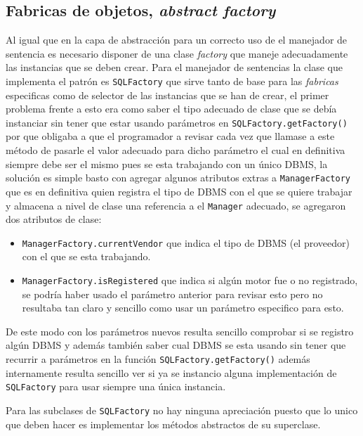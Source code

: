 \subsection{Fabricas de objetos, \textit{abstract factory}}
%
Al igual que en la capa de abstracción para un correcto uso de el manejador de sentencia es necesario disponer de una clase \textit{factory} que maneje adecuadamente las instancias que se deben crear. Para el manejador de sentencias la clase que implementa el patrón es \verb=SQLFactory= que sirve tanto de base para las \textit{fabricas} especificas como de selector de las instancias que se han de crear, el primer problema frente a esto era como saber el tipo adecuado de clase que se debía instanciar sin tener que estar usando parámetros en \verb=SQLFactory.getFactory()= por que obligaba a que el programador a revisar cada vez que llamase a este método de pasarle el valor adecuado para dicho parámetro el cual en definitiva siempre debe ser el mismo pues se esta trabajando con un único DBMS, la solución es simple basto con agregar algunos atributos extras a \verb=ManagerFactory= que es en definitiva quien registra el tipo de DBMS con el que se quiere trabajar y almacena a nivel de clase una referencia a el \verb=Manager= adecuado, se agregaron dos atributos de clase:
\begin{itemize}
\item \verb=ManagerFactory.currentVendor= que indica el tipo de DBMS (el proveedor) con el que se esta trabajando.
\item \verb=ManagerFactory.isRegistered= que indica si algún motor fue o no registrado, se podría haber usado el parámetro anterior para revisar esto pero no resultaba tan claro y sencillo como usar un parámetro especifico para esto.
\end{itemize}
De este modo con los parámetros nuevos resulta sencillo comprobar si se registro algún DBMS y además también saber cual DBMS se esta usando sin tener que recurrir a parámetros en la función  \verb=SQLFactory.getFactory()= además internamente resulta sencillo ver si ya se instancio alguna implementación de \verb=SQLFactory= para usar siempre una única instancia.

Para las subclases de \verb=SQLFactory= no hay ninguna apreciación puesto que lo unico que deben hacer es implementar los métodos abstractos de su superclase. 
%
